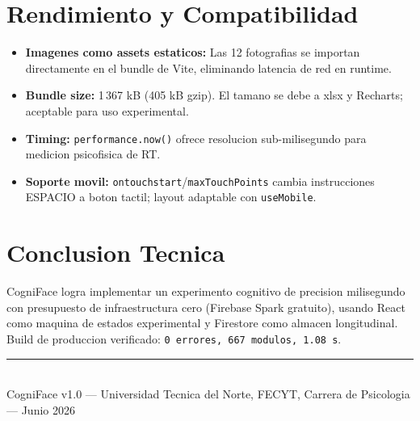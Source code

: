 \documentclass[12pt,a4paper]{article}
\begin{document}
\section{Rendimiento y Compatibilidad}

\begin{itemize}
  \item \textbf{Imagenes como assets estaticos:} Las 12 fotografias se importan
        directamente en el bundle de Vite, eliminando latencia de red en runtime.
  \item \textbf{Bundle size:} 1\,367 kB (405 kB gzip). El tamano se debe a
        xlsx y Recharts; aceptable para uso experimental.
  \item \textbf{Timing:} \texttt{performance.now()} ofrece resolucion
        sub-milisegundo para medicion psicofisica de RT.
  \item \textbf{Soporte movil:} \texttt{ontouchstart}/\texttt{maxTouchPoints}
        cambia instrucciones ESPACIO a boton tactil; layout adaptable con
        \texttt{useMobile}.
\end{itemize}

\section*{Conclusion Tecnica}

CogniFace logra implementar un experimento cognitivo de precision milisegundo
con presupuesto de infraestructura cero (Firebase Spark gratuito), usando React
como maquina de estados experimental y Firestore como almacen longitudinal.
Build de produccion verificado: \texttt{0 errores, 667 modulos, 1.08 s}.

\vspace{2em}
\noindent\rule{\textwidth}{0.4pt}\\[0.3em]
{\small CogniFace v1.0 --- Universidad Tecnica del Norte,
FECYT, Carrera de Psicologia --- Junio 2026}
\end{document}
